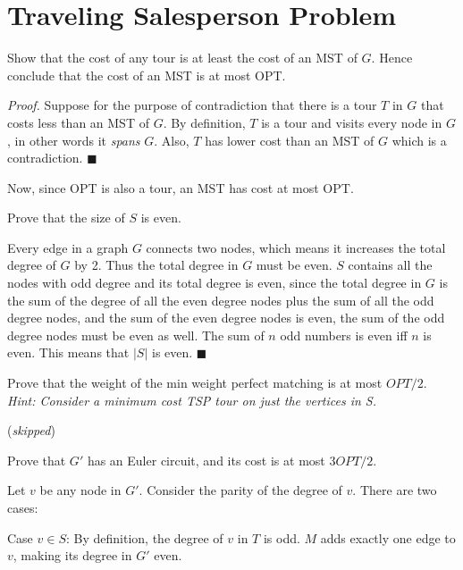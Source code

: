 \documentclass[../main.tex]{subfiles}
\begin{document}
\section{Traveling Salesperson Problem}

\begin{questions}

  \question Show that the cost of any tour is at least the cost of an MST of $G$. Hence conclude that the cost of an MST is at most OPT.
  \begin{solution}
    \textit{Proof.} Suppose for the purpose of contradiction that there is a tour $T$ in $G$ that costs less than an MST of $G$. By definition, $T$ is a tour and visits every node in $G$, in other words it \textit{spans} $G$. Also, $T$ has lower cost than an MST of $G$ which is a contradiction. $\blacksquare$

    Now, since OPT is also a tour, an MST has cost at most OPT.
  \end{solution}

  \question Prove that the size of $S$ is even.
  \begin{solution}
    Every edge in a graph $G$ connects two nodes, which means it increases the total degree of $G$ by 2. Thus the total degree in $G$ must be even. $S$ contains all the nodes with odd degree and its total degree is even, since the total degree in $G$ is the sum of the degree of all the even degree nodes plus the sum of all the odd degree nodes, and the sum of the even degree nodes is even, the sum of the odd degree nodes must be even as well. The sum of $n$ odd numbers is even iff $n$ is even. This means that $\lvert S \rvert$ is even. $\blacksquare$
  \end{solution}

  \question Prove that the weight of the min weight perfect matching is at most $OPT/2$. \textit{Hint: Consider a minimum cost TSP tour on just the vertices in S.}
  \begin{solution}
    (\textit{skipped})
  \end{solution}

  \question Prove that $G'$ has an Euler circuit, and its cost is at most $3OPT/2$.
  \begin{solution}
    Let $v$ be any node in $G'$. Consider the parity of the degree of $v$. There are two cases:

    Case $v \in S$: By definition, the degree of $v$ in $T$ is odd. $M$ adds exactly one edge to $v$, making its degree in $G'$ even.


\end{solution}
\end{questions}
\end{document}
